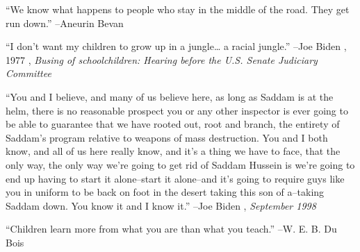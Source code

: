\documentclass{article}%
\begin{document}
\vspace{1mm}%
\begin{minipage}{\textwidth}%
\flushleft%
“We know what happens to people who stay in the middle of the road. They get run down.”%
\linebreak%
\vspace{1mm}%
–Aneurin Bevan%
\linebreak%
\vspace{1mm}%
\end{minipage}%
\linebreak%
\vspace{1mm}%
\begin{minipage}{\textwidth}%
\flushleft%
“I don't want my children to grow up in a jungle… a racial jungle.”%
\linebreak%
\vspace{1mm}%
–Joe Biden%
, 1977%
, \textit{Busing of schoolchildren: Hearing before the U.S. Senate Judiciary Committee}%
\linebreak%
\vspace{1mm}%
\end{minipage}%
\linebreak%
\vspace{1mm}%
\begin{minipage}{\textwidth}%
\flushleft%
“You and I believe, and many of us believe here, as long as Saddam is at the helm, there is no reasonable prospect you or any other inspector is ever going to be able to guarantee that we have rooted out, root and branch, the entirety of Saddam's program relative to weapons of mass destruction. You and I both know, and all of us here really know, and it's a thing we have to face, that the only way, the only way we're going to get rid of Saddam Hussein is we're going to end up having to start it alone–start it alone–and it's going to require guys like you in uniform to be back on foot in the desert taking this son of a–taking Saddam down. You know it and I know it.”%
\linebreak%
\vspace{1mm}%
–Joe Biden%
, \textit{September 1998}%
\linebreak%
\vspace{1mm}%
\end{minipage}%
\linebreak%
\vspace{1mm}%
\begin{minipage}{\textwidth}%
\flushleft%
“Children learn more from what you are than what you teach.”%
\linebreak%
\vspace{1mm}%
–W. E. B. Du Bois%
\linebreak%
\vspace{1mm}%
\end{minipage}%
\end{document}
